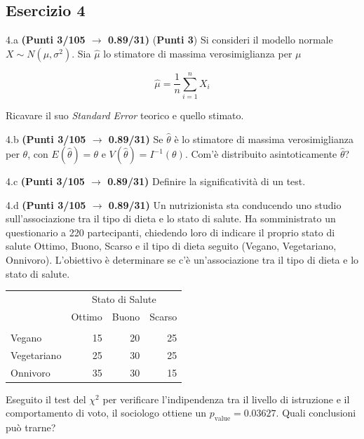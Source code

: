\documentclass[
  11pt,
]{book}
\theoremstyle{mytheoremstyle}
\theoremstyle{mydefstyle}
\begin{document}
\subsection{Esercizio 4}\label{esercizio-4-36}

4.a \textbf{(Punti 3/105 \(\rightarrow\) 0.89/31)} (\textbf{Punti 3}) Si consideri il modello normale \(X\sim N(\mu,\sigma^2)\). Sia \(\hat\mu\) lo stimatore di massima verosimiglianza per \(\mu\)

\[
  \hat\mu = \frac 1n \sum_{i=1}^n X_i
\]

Ricavare il suo \emph{Standard Error} teorico e quello stimato.

4.b \textbf{(Punti 3/105 \(\rightarrow\) 0.89/31)} Se \(\hat\theta\) è lo stimatore di massima verosimiglianza
per \(\theta\), con \(E(\hat\theta)=\theta\) e \(V(\hat\theta)=I^{-1}(\theta)\).
Com'è distribuito asintoticamente \(\hat\theta\)?

4.c \textbf{(Punti 3/105 \(\rightarrow\) 0.89/31)} Definire la significatività di un test.

4.d \textbf{(Punti 3/105 \(\rightarrow\) 0.89/31)} Un nutrizionista sta conducendo uno studio sull'associazione tra il tipo di dieta e lo stato di salute. Ha somministrato un questionario a 220 partecipanti, chiedendo loro di indicare il proprio stato di salute Ottimo, Buono, Scarso e il tipo di dieta seguito (Vegano, Vegetariano, Onnivoro). L'obiettivo è determinare se c'è un'associazione tra il tipo di dieta e lo stato di salute.

\begin{table}[H]
\centering\centering\centering
\begin{tabular}{lrrr}
\toprule
\multicolumn{1}{c}{ } & \multicolumn{3}{c}{Stato di Salute} \\
\cmidrule(l{3pt}r{3pt}){2-4}
  & Ottimo & Buono & Scarso\\
\midrule
\addlinespace[0.3em]
\multicolumn{4}{l}{\textbf{Tipo di Dieta}}\\
\hspace{1em}Vegano & 15 & 20 & 25\\
\hspace{1em}Vegetariano & 25 & 30 & 25\\
\hspace{1em}Onnivoro & 35 & 30 & 15\\
\bottomrule
\end{tabular}
\end{table}

Eseguito il test del \(\chi^2\) per verificare l'indipendenza tra il livello di istruzione e il comportamento di voto, il sociologo ottiene un \(p_\text{value}=0.03627\). Quali conclusioni può trarne?
\end{document}
